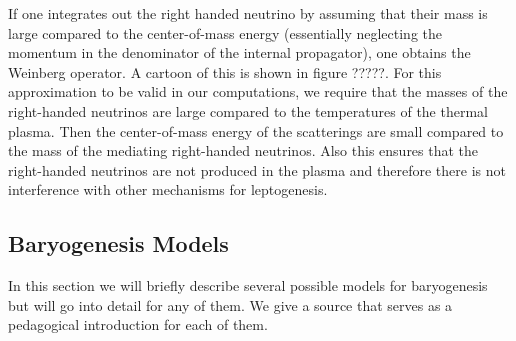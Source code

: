 \documentclass[13pt,a4paper,twoside,titlepage]{article}
\begin{document}
If one integrates out the right handed neutrino by assuming that their mass is
large compared to the center-of-mass energy (essentially neglecting the momentum in the denominator of the internal propagator), one obtains the Weinberg operator.
A cartoon of this is shown in figure ?????.
For this approximation to be valid in our computations, we require that
the masses of the right-handed neutrinos are large compared to the temperatures
of the thermal plasma. Then the center-of-mass energy of the scatterings are
small compared to the mass of the mediating right-handed neutrinos.
Also this ensures that the right-handed neutrinos are not produced in the plasma and therefore there is not interference with other mechanisms for leptogenesis.



\subsection{Baryogenesis Models}
In this section we will briefly describe several possible models for baryogenesis but will go into detail for any of them.
We give a source that serves as a pedagogical introduction for each of them.
\end{document}
